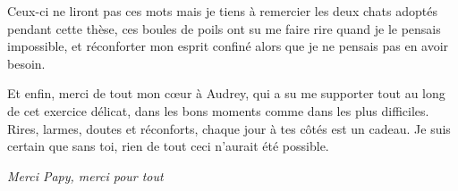 \vspace{\merciSpace}

Ceux-ci ne liront pas ces mots mais je tiens à remercier les deux chats adoptés pendant cette thèse, ces boules de poils ont su me faire rire quand je le pensais impossible, et réconforter mon esprit confiné alors que je ne pensais pas en avoir besoin.

\vspace{\merciSpace}

Et enfin, merci de tout mon cœur à Audrey, qui a su me supporter tout au long de cet exercice délicat, dans les bons moments comme dans les plus difficiles. Rires, larmes, doutes et réconforts, chaque jour à tes côtés est un cadeau. Je suis certain que sans toi, rien de tout ceci n'aurait été possible.

\vfill

\begin{flushright}
\textit{Merci Papy, merci pour tout}
\end{flushright}
\fi